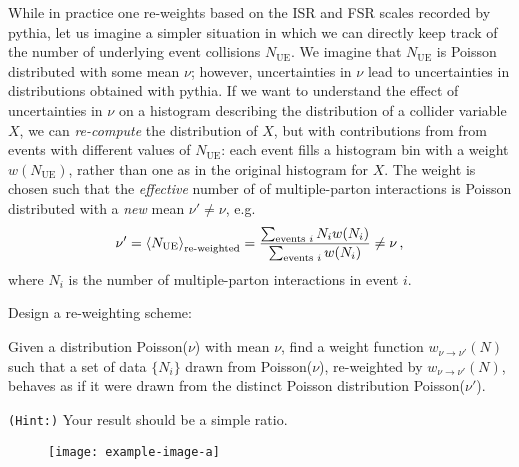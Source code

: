 \begin{subappendices}
\begin{example}
    \label{ex:reweighting-ue}
    While in practice one re-weights based on the ISR and FSR scales recorded by \gls{pythia}, let us imagine a simpler situation in which we can directly keep track of the number of underlying event collisions \(N_\text{UE}\).
    We imagine that \(N_\text{UE}\) is Poisson distributed with some mean \(\nu\);
    however, uncertainties in \(\nu\) lead to uncertainties in distributions obtained with \gls{pythia}.
    If we want to understand the effect of uncertainties in \(\nu\) on a histogram describing the distribution of a collider variable \(X\), we can \textit{re-compute} the distribution of \(X\), but with  contributions from from events with different values of \(N_\text{UE}\):
    each event fills a histogram bin with a weight \(w(N_\text{UE})\), rather than one as in the original histogram for \(X\).
    The weight is chosen such that the \textit{effective} number of of multiple-parton interactions is Poisson distributed with a \textit{new} mean \(\nu' \neq \nu\), e.g.
    \begin{align}
        \label{eq:re-weighting-ue}
        \nu'
        =
        \le\langle N_\text{UE}\ri\rangle_\text{re-weighted}
        =
        \frac{
            \sum_{\text{events } i}
            N_i w(N_i)
        }{
            \sum_{\text{events } i}
            w(N_i)
        }
        \neq
        \nu
        \,,
    \end{align}
    where \(N_i\) is the number of multiple-parton interactions in event \(i\).
\end{example}

\begin{exercise}
    Design a re-weighting scheme:

    Given a distribution Poisson($\nu$) with mean \(\nu\), find a weight function \(w_{\nu \to \nu'}(N)\) such that a set of data \(\{N_i\}\) drawn from Poisson($\nu$), re-weighted by \(w_{\nu \to \nu'}(N)\), behaves as if it were drawn from the distinct Poisson distribution Poisson($\nu'$).

    \vspace{7pt}

    \texttt{(Hint:)}
    Your result should be a simple ratio.
\end{exercise}


\begin{figure}[]
    \centering
    \texttt{[image: example-image-a]}
    \caption{}
    \label{fig:reweighting}
\end{figure}



\end{subappendices}
